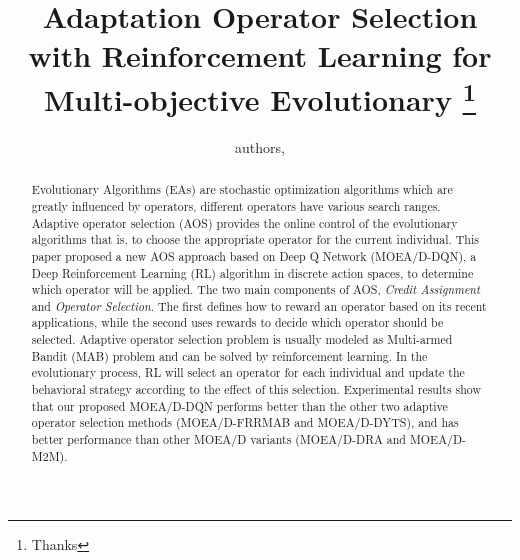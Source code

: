 \documentclass[journal]{IEEEtran}
\begin{document}
\title{{Adaptation Operator Selection with Reinforcement Learning for Multi-objective Evolutionary}
  \thanks{Thanks}}
\author{
  authors,
}%



\maketitle

\begin{abstract}
  Evolutionary Algorithms (EAs) are stochastic optimization algorithms which are greatly influenced by operators, different operators have various search ranges.
  Adaptive operator selection (AOS) provides the online control of the evolutionary algorithms that is, to choose the appropriate operator for the current individual.
  This paper proposed a new AOS approach based on Deep Q Network (MOEA/D-DQN), a Deep Reinforcement Learning (RL) algorithm in discrete action spaces, to determine which operator will be applied.
  The two main components of AOS, \textit{Credit Assignment} and \textit{Operator Selection}. The first defines how to reward an operator based on its recent applications, while the second uses rewards to decide which operator should be selected.
  Adaptive operator selection problem is usually modeled as Multi-armed Bandit (MAB) problem and can be solved by reinforcement learning.
  In the evolutionary process, RL will select an operator for each individual and update the behavioral strategy according to the effect of this selection.
  Experimental results show that our proposed MOEA/D-DQN performs better than the other two adaptive operator selection methods (MOEA/D-FRRMAB and MOEA/D-DYTS), and has better performance than other MOEA/D variants (MOEA/D-DRA and MOEA/D-M2M).
\end{abstract}
\end{document}
